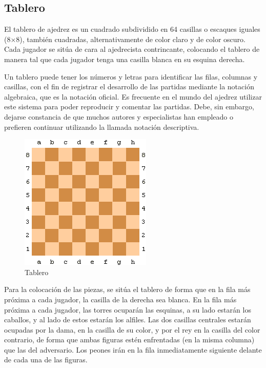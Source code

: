 \subsection{Tablero}

El tablero de ajedrez es un cuadrado subdividido en 64 casillas o escaques iguales (8×8), también cuadradas, alternativamente de color claro y de color oscuro. Cada jugador se sitúa de cara al ajedrecista contrincante, colocando el tablero de manera tal que cada jugador tenga una casilla blanca en su esquina derecha. 

Un tablero puede tener los números y letras para identificar las filas, columnas y casillas, con el fin de registrar el desarrollo de las partidas mediante la notación algebraica, que es la notación oficial. Es frecuente en el mundo del ajedrez utilizar este sistema para poder reproducir y comentar las partidas. Debe, sin embargo, dejarse constancia de que muchos autores y especialistas han empleado o prefieren continuar utilizando la llamada notación descriptiva. 



\begin{figure}[!h]
	\centering 
	\includegraphics[scale=0.70]{img/tableroajedrez}
	\caption{Tablero}
	\label{contexto:figuratablero1}
\end{figure}

Para la colocación de las piezas, se sitúa el tablero de forma que en la fila más próxima a cada jugador, la casilla de la derecha sea blanca. En la fila más próxima a cada jugador, las torres ocuparán las esquinas, a su lado estarán los caballos, y al lado de estos estarán los alfiles. Las dos casillas centrales estarán ocupadas por la dama, en la casilla de su color, y por el rey en la casilla del color contrario, de forma que ambas figuras estén enfrentadas (en la misma columna) que las del adversario. Los peones irán en la fila inmediatamente siguiente delante de cada una de las figuras. 


